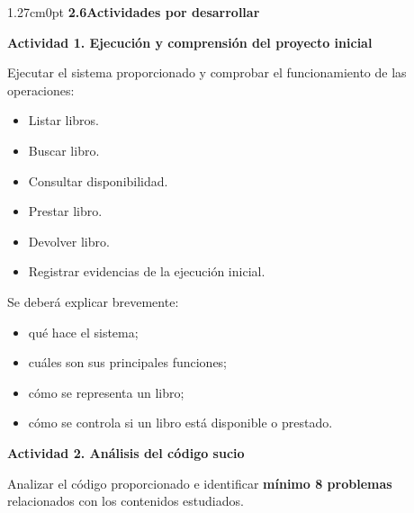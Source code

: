 \documentclass[12pt,letterpaper]{article}
\begin{document}
\vspace{6pt}

\begin{adjustwidth}{1.27cm}{0pt}
\textbf{2.6\enspace Actividades por desarrollar}
\end{adjustwidth}

\vspace{4pt}

\noindent\textbf{Actividad 1. Ejecuci\'on y comprensi\'on del proyecto inicial}

\vspace{2pt}
Ejecutar el sistema proporcionado y comprobar el funcionamiento de las operaciones:

\begin{itemize}[leftmargin=1.27cm, label=\textbullet, topsep=1pt, itemsep=0pt, parsep=0pt]
  \item Listar libros.
  \item Buscar libro.
  \item Consultar disponibilidad.
  \item Prestar libro.
  \item Devolver libro.
  \item Registrar evidencias de la ejecuci\'on inicial.
\end{itemize}

Se deber\'a explicar brevemente:

\begin{itemize}[leftmargin=1.27cm, label=\textbullet, topsep=1pt, itemsep=0pt, parsep=0pt]
  \item qu\'e hace el sistema;
  \item cu\'ales son sus principales funciones;
  \item c\'omo se representa un libro;
  \item c\'omo se controla si un libro est\'a disponible o prestado.
\end{itemize}

\vspace{8pt}

\noindent\textbf{Actividad 2. An\'alisis del c\'odigo sucio}

\vspace{2pt}
Analizar el c\'odigo proporcionado e identificar \textbf{m\'inimo 8 problemas} relacionados con los contenidos estudiados.
\end{document}

